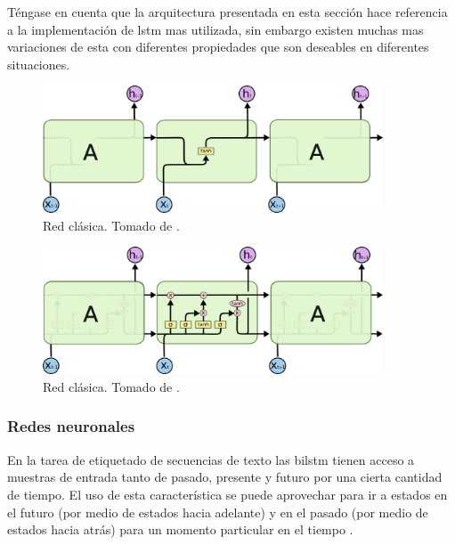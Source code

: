 Téngase en cuenta que la arquitectura presentada en esta sección hace referencia a la implementación de \gls{lstm} mas utilizada, sin embargo existen muchas mas variaciones de esta con diferentes propiedades que son deseables en diferentes situaciones.
\begin{figure}[H]
  \centering
  \includegraphics[width=0.9\textwidth]{Figures/LSTM3-SimpleRNN.png}
\decoRule
\caption[Red  clásica]{Red  clásica. Tomado de \cite{understanding-lstm}.}
\label{fig:rnn-classic}
\end{figure}

\begin{figure}[H]
  \centering
  \includegraphics[width=0.9\textwidth]{Figures/LSTM3-chain.png}
\decoRule
\caption[Red  clásica]{Red  clásica. Tomado de \cite{understanding-lstm}.}
\label{fig:lstm-classic}
\end{figure}

\subsubsection{Redes neuronales }
En la tarea de etiquetado de secuencias de texto las \gls{bilstm} tienen acceso a muestras de entrada tanto de pasado, presente y futuro por una cierta cantidad de tiempo. El uso de esta característica se puede aprovechar para ir a estados en el futuro (por medio de estados hacia adelante) y en el pasado (por medio de estados hacia atrás) para un momento particular en el tiempo \cite{Huang2015}.

